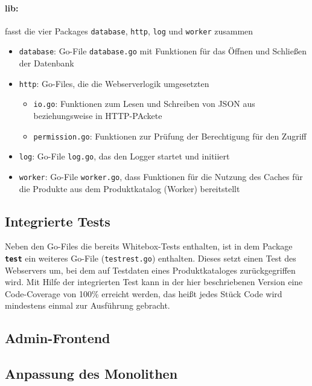 \newpage
\paragraph{lib:} fasst die vier Packages \texttt{database}, \texttt{http}, \texttt{log} und \texttt{worker} zusammen

	\begin{itemize}
	\item \texttt{database}: Go-File \texttt{database.go} mit Funktionen für das Öffnen und Schließen der Datenbank
	\item \texttt{http}: Go-Files, die die Webserverlogik umgesetzten
		\begin{itemize}
		\item \texttt{io.go}: Funktionen zum Lesen und Schreiben von JSON aus beziehungsweise in HTTP-PAckete
		\item \texttt{permission.go}: Funktionen zur Prüfung der Berechtigung für den Zugriff
		\end{itemize}	
	\item \texttt{log}: Go-File \texttt{log.go}, das den Logger startet und initiiert
	\item \texttt{worker}: Go-File \texttt{worker.go}, dass Funktionen für die Nutzung des Caches für die Produkte aus dem Produktkatalog (Worker) bereitstellt 
	\end{itemize}

\subsection{Integrierte Tests}
\label{subsec: Integrierte Test}
Neben den Go-Files die bereits Whitebox-Tests enthalten, ist in dem Package \textbf{\texttt{test}} ein weiteres Go-File (\texttt{testrest.go}) enthalten. Dieses setzt einen Test des Webservers um, bei dem auf Testdaten eines Produktkataloges zurückgegriffen wird. Mit Hilfe der integrierten Test kann in der hier beschriebenen Version eine Code-Coverage von 100\% erreicht werden, das heißt jedes Stück Code wird mindestens einmal zur Ausführung gebracht.

\subsection{Admin-Frontend}
\label{subsec: Admin-Frontend}



\subsection{Anpassung des Monolithen}
\label{subsec: Anpassung des Monolithen}
